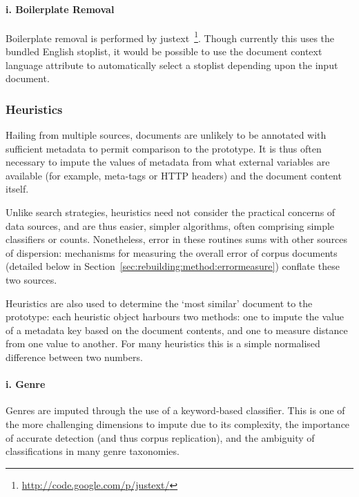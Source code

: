 \paragraph{i. Boilerplate Removal}
Boilerplate removal is performed by justext~\footnote{\url{http://code.google.com/p/justext/}}.  Though currently this uses the bundled English stoplist, it would be possible to use the document context language attribute to automatically select a stoplist depending upon the input document.




\subsubsection{Heuristics}
Hailing from multiple sources, documents are unlikely to be annotated with sufficient metadata to permit comparison to the prototype.  It is thus often necessary to impute the values of metadata from what external variables are available (for example, meta-tags or HTTP headers) and the document content itself.

Unlike search strategies, heuristics need not consider the practical concerns of data sources, and are thus easier, simpler algorithms, often comprising simple classifiers or counts.  Nonetheless, error in these routines sums with other sources of dispersion: mechanisms for measuring the overall error of corpus documents (detailed below in Section~\ref{sec:rebuilding:method:errormeasure}) conflate these two sources.

Heuristics are also used to determine the `most similar' document to the prototype: each heuristic object harbours two methods: one to impute the value of a metadata key based on the document contents, and one to measure distance from one value to another.  For many heuristics this is a simple normalised difference between two numbers.


\paragraph{i. Genre}
Genres are imputed through the use of a keyword-based classifier.  This is one of the more challenging dimensions to impute due to its complexity, the importance of accurate detection (and thus corpus replication), and the ambiguity of classifications in many genre taxonomies.



